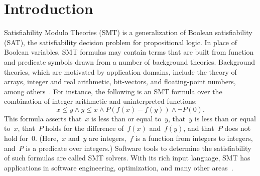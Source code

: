 \documentclass[dvipsnames,table,twoside,11pt]{article}
\newcommand{\maintrack}{Main Track\xspace}
\newcommand{\ucoretrack}{Unsat-Core Track\xspace}
\begin{document}


\section{Introduction}
\label{sec:introduction}

Satisfiability Modulo Theories (SMT) is a generalization of Boolean
satisfiability (SAT), the satisfiability decision problem for
propositional logic.  In place of Boolean variables, SMT formulas may
contain terms that are built from function and predicate symbols drawn
from a number of background theories.  Background theories, which are
motivated by application domains, include the theory of arrays,
integer and real arithmetic, bit-vectors, and floating-point numbers,
among others~\cite{BarFT-RR-17}.  For instance, the following is an
SMT formula over the combination of integer arithmetic and
uninterpreted functions:
%
$$x \leq y \wedge y \leq x \wedge P (f(x) - f(y)) \wedge \neg P(0).$$
%
This formula asserts that~$x$ is less than or equal to~$y$, that~$y$
is less than or equal to~$x$, that~$P$ holds for the difference
of~$f(x)$ and~$f(y)$, and that~$P$ does not hold for~$0$.  (Here,~$x$
and~$y$ are integers,~$f$ is a function from integers to integers,
and~$P$ is a predicate over integers.)
%
Software tools to determine the satisfiability of such formulas are
called SMT solvers.  With its rich input language, SMT has
applications in software engineering, optimization, and many other
areas~\cite{DeMoura:2011:SMT}.
\end{document}
